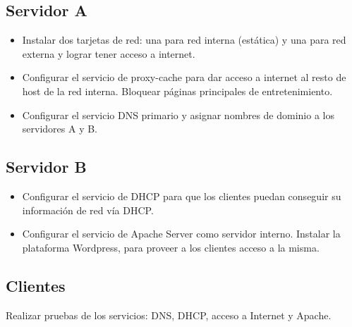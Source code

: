 \documentclass[12pt]{report}
\begin{document}
        \subsection*{Servidor A}
        \begin{itemize}
            \item Instalar dos tarjetas de red: una para red interna (estática) y una para red externa y lograr tener acceso a internet.
            \item Configurar el servicio de proxy-cache para dar acceso a internet al resto de host de la red interna. Bloquear páginas principales de entretenimiento.
            \item Configurar el servicio DNS primario y asignar nombres de dominio a los servidores A y B.
        \end{itemize}
        \subsection*{Servidor B}
        \begin{itemize}
            \item Configurar el servicio de DHCP para que los clientes puedan conseguir su información de red vía DHCP.
            \item Configurar el servicio de Apache Server como servidor interno. Instalar la plataforma Wordpress, para proveer a los clientes acceso a la misma.
        \end{itemize}
        \subsection*{Clientes}
        Realizar pruebas de los servicios: DNS, DHCP, acceso a Internet y Apache.
    
\end{document}
